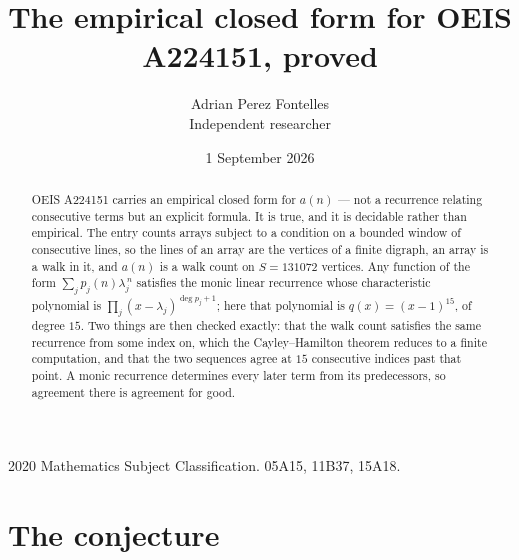 \documentclass[11pt,a4paper]{article}
\title{The empirical closed form for OEIS A224151, proved}
\author{Adrian Perez Fontelles\\ \small Independent researcher}
\date{1 September 2026}
\theoremstyle{plain}
\theoremstyle{definition}
\begin{document}
\maketitle

\begin{abstract}
OEIS A224151 carries an empirical closed form for $a(n)$ --- not a recurrence relating
consecutive terms but an explicit formula. It is true, and it is decidable rather than
empirical. The entry counts arrays subject to a condition on a bounded window of consecutive lines, so the lines of an array are the
vertices of a finite digraph, an array is a walk in it, and $a(n)$ is a walk count on
$S=131072$ vertices. Any function of the form $\sum_j p_j(n)\lambda_j^{\,n}$ satisfies the
monic linear recurrence whose characteristic polynomial is
$\prod_j(x-\lambda_j)^{\deg p_j+1}$; here that polynomial is $q(x)=(x-1)^{15}$, of degree
$15$. Two things are then checked exactly: that the walk count satisfies the same
recurrence from some index on, which the Cayley--Hamilton theorem reduces to a finite
computation, and that the two sequences agree at $15$ consecutive indices past that
point. A monic recurrence determines every later term from its predecessors, so agreement
there is agreement for good.
\end{abstract}

\noindent\small 2020 Mathematics Subject Classification. 05A15, 11B37, 15A18.\normalsize

\section{The conjecture}
\end{document}
